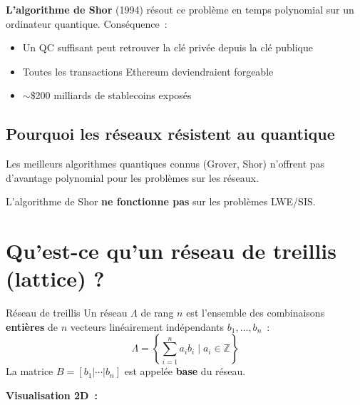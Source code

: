 \documentclass[12pt, a4paper]{article}
\begin{document}
\textbf{L'algorithme de Shor} (1994) résout ce problème en temps polynomial
sur un ordinateur quantique. Conséquence~:
\begin{itemize}
  \item Un QC suffisant peut retrouver la clé privée depuis la clé publique
  \item Toutes les transactions Ethereum deviendraient forgeable
  \item $\sim$\$200 milliards de stablecoins exposés
\end{itemize}

\subsection{Pourquoi les réseaux résistent au quantique}

Les meilleurs algorithmes quantiques connus (Grover, Shor) n'offrent pas
d'avantage polynomial pour les problèmes sur les réseaux.

L'algorithme de Shor \textbf{ne fonctionne pas} sur les problèmes LWE/SIS.

\section{Qu'est-ce qu'un réseau de treillis (lattice) ?}

\begin{defbox}{Réseau de treillis}
Un réseau $\Lambda$ de rang $n$ est l'ensemble des combinaisons
\textbf{entières} de $n$ vecteurs linéairement indépendants $b_1, \ldots, b_n$~:
$$\Lambda = \left\{ \sum_{i=1}^n a_i b_i \mid a_i \in \mathbb{Z} \right\}$$
La matrice $B = [b_1 | \cdots | b_n]$ est appelée \textbf{base} du réseau.
\end{defbox}

\textbf{Visualisation 2D~:}

\begin{center}
\end{center}
\end{document}
